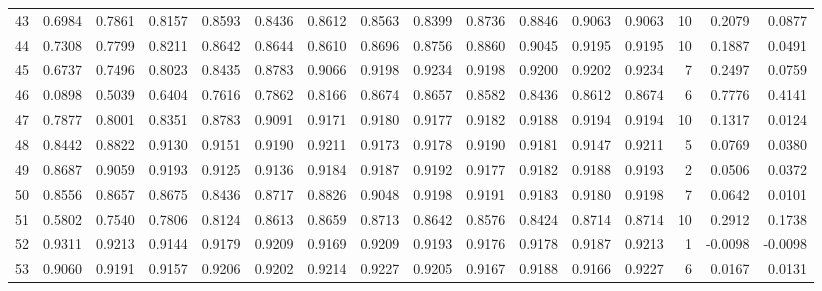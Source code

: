\begin{tabular}{lrrrrrrrrrrrrrrr}
43  &      0.6984 &  0.7861 &  0.8157 &  0.8593 &  0.8436 &  0.8612 &  0.8563 &  0.8399 &  0.8736 &  0.8846 &   0.9063 &     0.9063 &     10 &                    0.2079 &                     0.0877 \\
44  &      0.7308 &  0.7799 &  0.8211 &  0.8642 &  0.8644 &  0.8610 &  0.8696 &  0.8756 &  0.8860 &  0.9045 &   0.9195 &     0.9195 &     10 &                    0.1887 &                     0.0491 \\
45  &      0.6737 &  0.7496 &  0.8023 &  0.8435 &  0.8783 &  0.9066 &  0.9198 &  0.9234 &  0.9198 &  0.9200 &   0.9202 &     0.9234 &      7 &                    0.2497 &                     0.0759 \\
46  &      0.0898 &  0.5039 &  0.6404 &  0.7616 &  0.7862 &  0.8166 &  0.8674 &  0.8657 &  0.8582 &  0.8436 &   0.8612 &     0.8674 &      6 &                    0.7776 &                     0.4141 \\
47  &      0.7877 &  0.8001 &  0.8351 &  0.8783 &  0.9091 &  0.9171 &  0.9180 &  0.9177 &  0.9182 &  0.9188 &   0.9194 &     0.9194 &     10 &                    0.1317 &                     0.0124 \\
48  &      0.8442 &  0.8822 &  0.9130 &  0.9151 &  0.9190 &  0.9211 &  0.9173 &  0.9178 &  0.9190 &  0.9181 &   0.9147 &     0.9211 &      5 &                    0.0769 &                     0.0380 \\
49  &      0.8687 &  0.9059 &  0.9193 &  0.9125 &  0.9136 &  0.9184 &  0.9187 &  0.9192 &  0.9177 &  0.9182 &   0.9188 &     0.9193 &      2 &                    0.0506 &                     0.0372 \\
50  &      0.8556 &  0.8657 &  0.8675 &  0.8436 &  0.8717 &  0.8826 &  0.9048 &  0.9198 &  0.9191 &  0.9183 &   0.9180 &     0.9198 &      7 &                    0.0642 &                     0.0101 \\
51  &      0.5802 &  0.7540 &  0.7806 &  0.8124 &  0.8613 &  0.8659 &  0.8713 &  0.8642 &  0.8576 &  0.8424 &   0.8714 &     0.8714 &     10 &                    0.2912 &                     0.1738 \\
52  &      0.9311 &  0.9213 &  0.9144 &  0.9179 &  0.9209 &  0.9169 &  0.9209 &  0.9193 &  0.9176 &  0.9178 &   0.9187 &     0.9213 &      1 &                   -0.0098 &                    -0.0098 \\
53  &      0.9060 &  0.9191 &  0.9157 &  0.9206 &  0.9202 &  0.9214 &  0.9227 &  0.9205 &  0.9167 &  0.9188 &   0.9166 &     0.9227 &      6 &                    0.0167 &                     0.0131 \\

\end{tabular}
